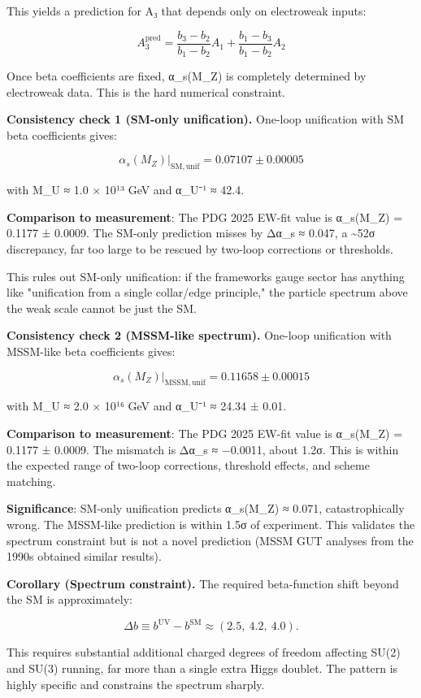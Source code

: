 This yields a prediction for A₃ that depends only on electroweak inputs:

\[
A_3^\mathrm{pred} = \frac{b_3 - b_2}{b_1 - b_2} A_1 + \frac{b_1 - b_3}{b_1 - b_2} A_2
\]

Once beta coefficients are fixed, α\_s(M\_Z) is completely determined by electroweak data. This is the hard numerical constraint.

\textbf{Consistency check 1 (SM-only unification).} One-loop unification with SM beta coefficients gives:

\[
\alpha_s(M_Z)|_\mathrm{SM,unif} = 0.07107 \pm 0.00005
\]

with M\_U ≈ 1.0 × 10¹³ GeV and α\_U⁻¹ ≈ 42.4.

\textbf{Comparison to measurement}: The PDG 2025 EW-fit value is α\_s(M\_Z) = 0.1177 ± 0.0009. The SM-only prediction misses by Δα\_s ≈ 0.047, a \textasciitilde52σ discrepancy, far too large to be rescued by two-loop corrections or thresholds.

This rules out SM-only unification: if the framework\textquotesingle s gauge sector has anything like "unification from a single collar/edge principle," the particle spectrum above the weak scale cannot be just the SM.

\textbf{Consistency check 2 (MSSM-like spectrum).} One-loop unification with MSSM-like beta coefficients gives:

\[
\alpha_s(M_Z)|_\mathrm{MSSM,unif} = 0.11658 \pm 0.00015
\]

with M\_U ≈ 2.0 × 10¹⁶ GeV and α\_U⁻¹ ≈ 24.34 ± 0.01.

\textbf{Comparison to measurement}: The PDG 2025 EW-fit value is α\_s(M\_Z) = 0.1177 ± 0.0009. The mismatch is Δα\_s ≈ −0.0011, about 1.2σ. This is within the expected range of two-loop corrections, threshold effects, and scheme matching.

\textbf{Significance}: SM-only unification predicts α\_s(M\_Z) ≈ 0.071, catastrophically wrong. The MSSM-like prediction is within 1.5σ of experiment. This validates the spectrum constraint but is not a novel prediction (MSSM GUT analyses from the 1990s obtained similar results).

\textbf{Corollary (Spectrum constraint).} The required beta-function shift beyond the SM is approximately:

\[
\Delta b \equiv b^{\mathrm{UV}} - b^{\mathrm{SM}} \approx (2.5,\ 4.2,\ 4.0).
\]

This requires substantial additional charged degrees of freedom affecting SU(2) and SU(3) running, far more than a single extra Higgs doublet. The pattern is highly specific and constrains the spectrum sharply.

